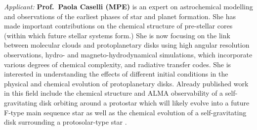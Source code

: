 \documentclass[10pt,fleqn,twoside]{article}
\begin{document}
{\it Applicant:} {\bf Prof.\ Paola Caselli (MPE)} 
is an expert on astrochemical
modelling and observations of the earliest phases of star and planet
formation. She has made important contributions on the chemical structure
of pre-stellar cores (within which future stellar systems form.)
She is
now focusing on the link between molecular clouds and protoplanetary
disks using high angular resolution observations, hydro- and
magneto-hydrodynamical simulations, which incorporate various degrees
of chemical complexity, and radiative transfer codes. She is
interested in understanding the effects of different initial
conditions in the physical and chemical evolution of protoplanetary
disks. Already published work in this field include the chemical
structure and ALMA observability of a self-gravitating disk orbiting
around a protostar which will likely evolve into a future F-type main
sequence star \citep{2011MNRAS.417.2950I, 2013MNRAS.433.2064D}
as well as the
chemical evolution of a self-gravitating disk surrounding a
protosolar-type star \citep{2015MNRAS.453.1147E}. 
\end{document}
